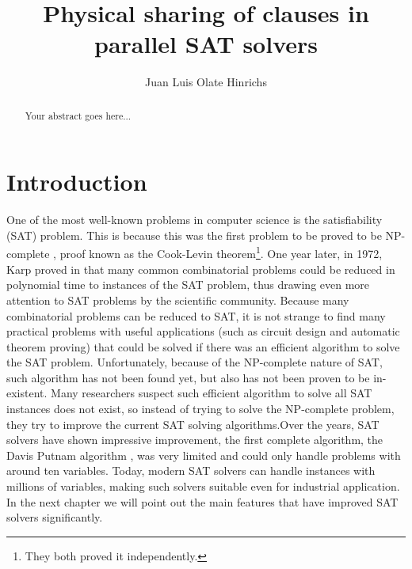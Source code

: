 \documentclass[12pt]{diicc}
\title{\bf Physical sharing of clauses in parallel SAT solvers}
\author{Juan Luis Olate Hinrichs}
\begin{document}
\frontmatter

%


%
\begin{abstract}
Your abstract goes here...
\end{abstract}

%
% 
\mainmatter
\chapter{Introduction}\label{chap:intro}

One of the most well-known problems in computer \cite{drepper2007} science is the satisfiability (SAT) problem. This is because this was the first problem to be proved to be NP-complete \cite{cook1971}, proof known as the Cook-Levin theorem\footnote[1]{They both proved it independently.}. One year later, in 1972, Karp proved in \cite{karp1972} that many common combinatorial problems could be reduced in polynomial time to instances of the SAT problem, thus drawing even more attention to SAT problems by the scientific community. Because many combinatorial problems can be reduced to SAT, it is not strange to find many practical problems with useful applications (such as circuit design and automatic theorem proving) that could be solved if there was an efficient algorithm to solve the SAT problem. Unfortunately, because of the NP-complete nature of SAT, such algorithm has not been found yet, but also has not been proven to be in-existent. Many researchers suspect such efficient algorithm to solve all SAT instances does not exist, so instead of trying to solve the NP-complete problem, they try to improve the current SAT solving algorithms.Over the years, SAT solvers have shown impressive improvement, the first complete algorithm, the Davis Putnam algorithm \cite{DP1960}, was very limited and could only handle problems with around ten variables. Today, modern SAT solvers can handle instances with millions of variables, making such solvers suitable even for industrial application. In the next chapter we will point out the main features that have improved SAT solvers significantly. 
\end{document}
